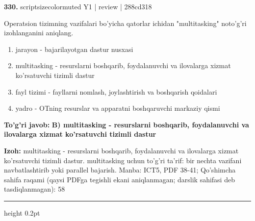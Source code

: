 \documentclass[10pt,a4paper]{article}
\begin{document}
{\bfseries\sffamily\color{ink} 330.} {scriptsizecolor{muted} Y1 | review | 288cd318}
\par
Operatsion tizimning vazifalari bo'yicha qatorlar ichidan "multitasking" noto'g'ri izohlanganini aniqlang.
\begin{enumerate}[label=\Alph*),leftmargin=9mm]
\item jarayon - bajarilayotgan dastur nusxasi
\item multitasking - resurslarni boshqarib, foydalanuvchi va ilovalarga xizmat ko'rsatuvchi tizimli dastur
\item fayl tizimi - fayllarni nomlash, joylashtirish va boshqarish qoidalari
\item yadro - OTning resurslar va apparatni boshqaruvchi markaziy qismi
\end{enumerate}
\begin{tcolorbox}[enhanced,breakable,colback=teal!4,colframe=teal!60!black,boxrule=0.45pt,arc=1.2mm,left=2.7mm,right=2.7mm,top=1.8mm,bottom=1.8mm,before skip=2mm,after skip=2mm]
{\bfseries\sffamily\color{teal}To'g'ri javob:} \textbf{B) multitasking - resurslarni boshqarib, foydalanuvchi va ilovalarga xizmat ko'rsatuvchi tizimli dastur}
\par\smallskip
{\bfseries Izoh:} multitasking - resurslarni boshqarib, foydalanuvchi va ilovalarga xizmat ko'rsatuvchi tizimli dastur. multitasking uchun to'g'ri ta'rif: bir nechta vazifani navbatlashtirib yoki parallel bajarish. Manba: ICT5, PDF 38-41; Qo'shimcha sahifa raqami (qaysi PDFga tegishli ekani aniqlanmagan; darslik sahifasi deb tasdiqlanmagan): 58
\end{tcolorbox}
\vspace{2mm}\hrule height 0.2pt\vspace{3mm}
\end{document}
